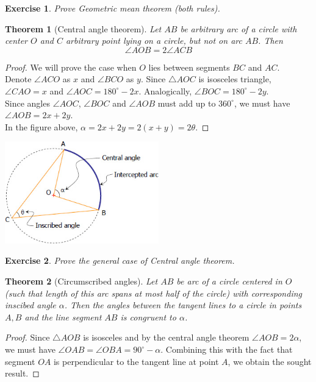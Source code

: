 \documentclass[11pt,a5paper]{article}
\newtheorem{exercise}{Exercise}
\newtheorem*{Theorem}{Theorem}
\begin{document}
\begin{exercise} Prove \emph{Geometric mean theorem} (both rules).
\end{exercise}
\break
\begin{Theorem}[Central angle theorem]
Let $AB$ be arbitrary arc of a circle with center $O$ and $C$ arbitrary point lying on a circle, but not on arc $AB$. Then \[\angle AOB = 2\angle ACB\]
\end{Theorem}
\begin{proof}
We will prove the case when $O$ lies between segments $BC$ and $AC$. \\
Denote $\angle ACO$ as $x$ and $\angle BCO$ as $y$. Since $\triangle AOC$ is isosceles triangle, $\angle CAO = x$ and $\angle AOC = 180^\circ - 2x$. Analogically, $\angle BOC = 180^\circ - 2y$. \\ Since angles $\angle AOC$, $\angle BOC$ and $\angle AOB$ must add up to $360^\circ$, we must have $\angle AOB = 2x + 2y$. \\
In the figure above, $\alpha = 2x + 2y = 2(x + y) = 2\theta$.
\end{proof}

\begin{center}
\includegraphics[width=0.5\textwidth]{central}
\end{center}

\begin{exercise}
Prove the general case of Central angle theorem.
\end{exercise}

\begin{Theorem}[Circumscribed angles]
Let $AB$ be arc of a circle centered in $O$ (such that length of this arc spans at most half of the circle) with corresponding inscibed angle $\alpha$. Then the angles between the tangent lines to a circle in points $A, B$ and the line segment $AB$ is congruent to $\alpha$.
\end{Theorem}
\begin{proof}
Since $\triangle AOB$ is isosceles and by the central angle theorem $\angle AOB = 2\alpha$, we must have $\angle OAB = \angle OBA = 90^\circ - \alpha$.
Combining this with the fact that segment $OA$ is perpendicular to the tangent line at point $A$, we obtain the sought result. 
\end{proof}
\end{document}
